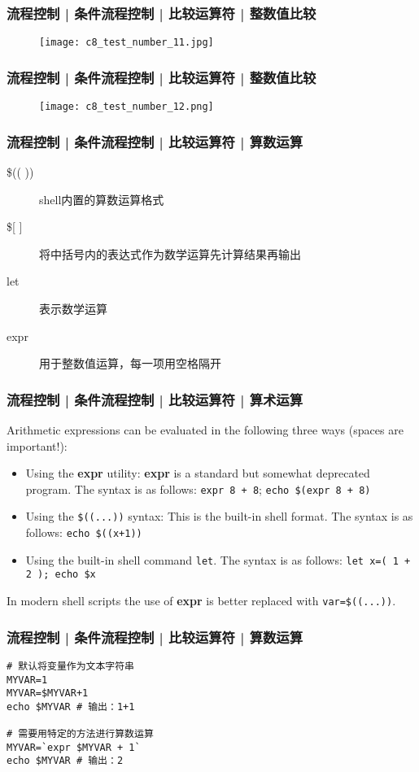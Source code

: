 \begin{frame}
  \frametitle{流程控制 | 条件流程控制 | 比较运算符 | 整数值比较}
  \begin{figure}
    \centering
    \texttt{[image: c8\_test\_number\_11.jpg]}
  \end{figure}
\end{frame}

\begin{frame}
  \frametitle{流程控制 | 条件流程控制 | 比较运算符 | 整数值比较}
  \begin{figure}
    \centering
    \texttt{[image: c8\_test\_number\_12.png]}
  \end{figure}
\end{frame}

\begin{frame}[fragile]
  \frametitle{流程控制 | 条件流程控制 | 比较运算符 | \alert{算数运算}}
  \begin{description}
    \item[\$(( ))] shell内置的算数运算格式
    \item[\${[} {]}] 将中括号内的表达式作为数学运算先计算结果再输出
    \item[let] 表示数学运算
    \item[expr] 用于整数值运算，每一项用空格隔开
  \end{description}
\end{frame}

\begin{frame}[fragile]
  \frametitle{流程控制 | 条件流程控制 | 比较运算符 | 算术运算}
  Arithmetic expressions can be evaluated in the following three ways (spaces are important!):
  \begin{itemize}
    \item Using the \textbf{expr} utility: \textbf{expr} is a standard but somewhat deprecated program. The syntax is as follows: \verb|expr 8 + 8|; \verb|echo $(expr 8 + 8)|
    \item Using the \verb|$((...))| syntax: This is the built-in shell format. The syntax is as follows: \verb|echo $((x+1))|
    \item Using the built-in shell command \verb|let|.  The syntax is as follows: \verb|let x=( 1 + 2 ); echo $x|
  \end{itemize}
  In modern shell scripts the use of \textbf{expr} is better replaced with \verb|var=$((...))|.
\end{frame}

\begin{frame}[fragile]
  \frametitle{流程控制 | 条件流程控制 | 比较运算符 | 算数运算}
\begin{lstlisting}
# 默认将变量作为文本字符串
MYVAR=1
MYVAR=$MYVAR+1
echo $MYVAR # 输出：1+1

# 需要用特定的方法进行算数运算
MYVAR=`expr $MYVAR + 1`
echo $MYVAR # 输出：2
\end{lstlisting}
\end{frame}

